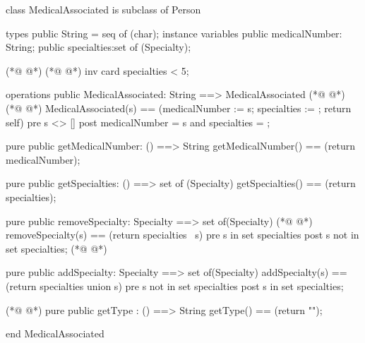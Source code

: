 \begin{vdmpp}[breaklines=true]
class MedicalAssociated is subclass of Person

types
 public String = seq of (char);
instance variables
  public medicalNumber: String;
  public specialties:set of (Specialty);
  
(*@
\label{MedicalAssociated:9}
@*)
(*@
\label{Doctor:9}
@*)
  inv card specialties < 5;

operations
 public MedicalAssociated: String ==> MedicalAssociated
(*@
\label{getMedicalNumber:13}
@*)
(*@
\label{getSpecialties:13}
@*)
  MedicalAssociated(s) == (medicalNumber := s; specialties := {}; return self)
 pre s <> []
 post medicalNumber = s and specialties = {};
 
 pure public getMedicalNumber: () ==> String
  getMedicalNumber() == (return medicalNumber);
 
 pure public getSpecialties: () ==> set of (Specialty)
  getSpecialties() == (return specialties);
  
 pure public removeSpecialty: Specialty ==> set of(Specialty)
(*@
\label{removeSpecialty:24}
@*)
  removeSpecialty(s) == (return specialties \ {s})
 pre s in set specialties
 post s not in set specialties;
(*@
\label{addSpecialty:27}
@*)
  
 pure public addSpecialty: Specialty ==> set of(Specialty)
  addSpecialty(s) == (return specialties union {s})
 pre s not in set specialties
 post s in set specialties;
 
(*@
\label{getType:33}
@*)
 pure public getType : () ==> String 
  getType() == (return "");

end MedicalAssociated
\end{vdmpp}
